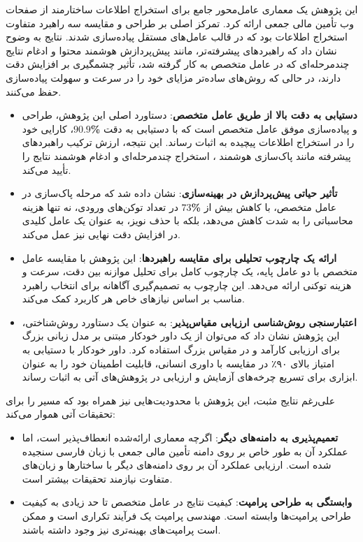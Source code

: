 

این پژوهش یک معماری عامل‌محور جامع برای استخراج اطلاعات ساختارمند از صفحات وب تأمین مالی جمعی ارائه کرد. تمرکز اصلی بر طراحی و مقایسه سه راهبرد متفاوت استخراج اطلاعات بود که در قالب عامل‌های مستقل پیاده‌سازی شدند. نتایج به وضوح نشان داد که راهبردهای پیشرفته‌تر، مانند پیش‌پردازش هوشمند محتوا و ادغام نتایج چندمرحله‌ای که در عامل متخصص به کار گرفته شد، تأثیر چشمگیری بر افزایش دقت دارند، در حالی که روش‌های ساده‌تر مزایای خود را در سرعت و سهولت پیاده‌سازی حفظ می‌کنند.


\begin{itemize}
    \item \textbf{دستیابی به دقت بالا از طریق عامل متخصص}: دستاورد اصلی این پژوهش، طراحی و پیاده‌سازی موفق عامل متخصص است که با دستیابی به دقت \textbf{\%$90.9$}، کارایی خود را در استخراج اطلاعات پیچیده به اثبات رساند. این نتیجه، ارزش ترکیب راهبردهای پیشرفته مانند پاک‌سازی هوشمند ، استخراج چندمرحله‌ای و ادغام هوشمند نتایج را تأیید می‌کند.

    \item \textbf{تأثیر حیاتی پیش‌پردازش در بهینه‌سازی}: نشان داده شد که مرحله پاک‌سازی  در عامل متخصص، با کاهش بیش از \textbf{\%$73$} در تعداد توکن‌های ورودی، نه تنها هزینه محاسباتی را به شدت کاهش می‌دهد، بلکه با حذف نویز، به عنوان یک عامل کلیدی در افزایش دقت نهایی نیز عمل می‌کند.

    \item \textbf{ارائه یک چارچوب تحلیلی برای مقایسه راهبردها}: این پژوهش با مقایسه عامل متخصص با دو عامل پایه، یک چارچوب کامل برای تحلیل موازنه بین دقت، سرعت و هزینه توکنی ارائه می‌دهد. این چارچوب به تصمیم‌گیری آگاهانه برای انتخاب راهبرد مناسب بر اساس نیازهای خاص هر کاربرد کمک می‌کند.

    \item \textbf{اعتبارسنجی روش‌شناسی ارزیابی مقیاس‌پذیر}: به عنوان یک دستاورد روش‌شناختی، این پژوهش نشان داد که می‌توان از یک داور خودکار مبتنی بر مدل زبانی بزرگ برای ارزیابی کارآمد و در مقیاس بزرگ استفاده کرد. داور خودکار با دستیابی به امتیاز  بالای ۹۰٪ در مقایسه با داوری انسانی، قابلیت اطمینان خود را به عنوان ابزاری برای تسریع چرخه‌های آزمایش و ارزیابی در پژوهش‌های آتی به اثبات رساند.
\end{itemize}


علی‌رغم نتایج مثبت، این پژوهش با محدودیت‌هایی نیز همراه بود که مسیر را برای تحقیقات آتی هموار می‌کند:
\begin{itemize}
    \item \textbf{تعمیم‌پذیری به دامنه‌های دیگر}: اگرچه معماری ارائه‌شده انعطاف‌پذیر است، اما عملکرد آن به طور خاص بر روی دامنه تأمین مالی جمعی با زبان فارسی سنجیده شده است. ارزیابی عملکرد آن بر روی دامنه‌های دیگر با ساختارها و زبان‌های متفاوت نیازمند تحقیقات بیشتر است.
    \item \textbf{وابستگی به طراحی پرامپت}: کیفیت نتایج در عامل متخصص تا حد زیادی به کیفیت طراحی پرامپت‌ها وابسته است. مهندسی پرامپت یک فرآیند تکراری است و ممکن است پرامپت‌های بهینه‌تری نیز وجود داشته باشند.
\end{itemize}

